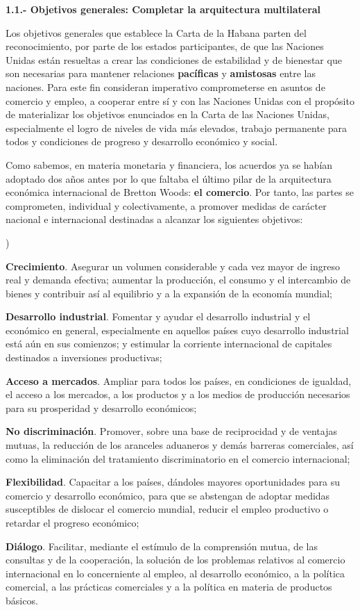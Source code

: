 \documentclass[10pt,a4paper]{article}
\newcounter{alphaitem}
\newenvironment{la}
      {\begin{list}{\alph{alphaitem})}{%
          \usecounter{alphaitem}%
          \setlength{\leftmargin}{1cm}%
          \setlength{\parskip}{3pt}%
          \setlength{\itemsep}{0pt}%
          \setlength{\parsep}{0pt}%
      }}
      {\end{list}}
\begin{document}
\textbf{1.1.- Objetivos generales: Completar la arquitectura multilateral}

Los objetivos generales que establece la Carta de la Habana parten del reconocimiento, por parte de los estados participantes, de que las Naciones Unidas están resueltas a crear las condiciones de estabilidad y de bienestar que son necesarias para mantener relaciones \textbf{pacíficas} y \textbf{amistosas} entre las naciones. Para este fin consideran imperativo comprometerse en asuntos de comercio y empleo, a cooperar entre sí y con las Naciones Unidas con el propósito de materializar los objetivos enunciados en la Carta de las Naciones Unidas, especialmente el logro de niveles de vida más elevados, trabajo permanente para todos y condiciones de progreso y desarrollo económico y social. 

Como sabemos, en materia monetaria y financiera, los acuerdos ya se habían adoptado dos años antes por lo que faltaba el último pilar de la arquitectura económica internacional de Bretton Woods: \textbf{el comercio}. Por tanto, las partes se comprometen, individual y colectivamente, a promover medidas de carácter nacional e internacional destinadas a alcanzar los siguientes objetivos: 
\begin{la}
    \item \textbf{Crecimiento}. Asegurar un volumen considerable y cada vez mayor de ingreso real y demanda efectiva; aumentar la producción, el consumo y el intercambio de bienes y contribuir así al equilibrio y a la expansión de la economía mundial;
    \item \textbf{Desarrollo industrial}. Fomentar y ayudar el desarrollo industrial y el económico en general, especialmente en aquellos países cuyo desarrollo industrial está aún en sus comienzos; y estimular la corriente internacional de capitales destinados a inversiones productivas;
    \item \textbf{Acceso a mercados}. Ampliar para todos los países, en condiciones de igualdad, el acceso a los mercados, a los productos y a los medios de producción necesarios para su prosperidad y desarrollo económicos;
    \item \textbf{No discriminación}. Promover, sobre una base de reciprocidad y de ventajas mutuas, la reducción de los aranceles aduaneros y demás barreras comerciales, así como la eliminación del tratamiento discriminatorio en el comercio internacional; 
    \item \textbf{Flexibilidad}. Capacitar a los países, dándoles mayores oportunidades para su comercio y desarrollo económico, para que se abstengan de adoptar medidas susceptibles de dislocar el comercio mundial, reducir el empleo productivo o retardar el progreso económico;
    \item \textbf{Diálogo}. Facilitar, mediante el estímulo de la comprensión mutua, de las consultas y de la cooperación, la solución de los problemas relativos al comercio internacional en lo concerniente al empleo, al desarrollo económico, a la política comercial, a las prácticas comerciales y a la política en materia de productos básicos. 
\end{la}
\end{document}
